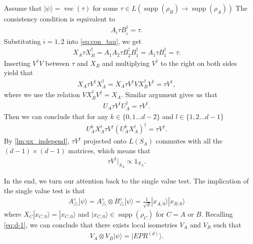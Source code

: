 \documentclass[11pt,letterpaper]{article}
\newcommand{\ket}[1]{|#1\rangle}
\newcommand{\x}{\otimes}
\DeclareMathOperator{\vc}{vec}
\DeclareMathOperator{\supp}{supp}
\newcommand{\1}{\mathbb{1}}
\newcommand{\EPR}[1]{EPR^{(#1)}}
\theoremstyle{definition}
\begin{document}
Assume that $\ket{\psi} = \vc(\tau)$ for some $\tau \in L(\supp(\rho_B) \to \supp(\rho_A))$
The consistency condition is equivalent to
\begin{align}
\label{eq:con_tau}
	A_i \tau B_i^\dagger = \tau.
\end{align}
Substituting $i=1,2$ into \cref{eq:con_tau}, we get 
\begin{align}
	X_A \tau X_B^\dagger = A_1A_2\tau B_2^\dagger B_1^\dagger = A_1\tau B_1^\dagger = \tau.
\end{align}
Inserting $V^\dagger V$ between $\tau$ and $X_B$ and multiplying $V^\dagger$ to the right on both sides yield that 
\begin{align}
	X_A \tau V^\dagger X_A^\dagger = X_A \tau V^\dagger VX_B^\dagger V^\dagger = \tau V^\dagger,
\end{align}
where we use the relation $VX_B^\dagger V^\dagger = X_A$.
Similar argument gives us that 
\begin{align}
	U_A \tau V^\dagger  U_A^\dagger = \tau V^\dagger.
\end{align}
Then we can conclude that for any $k \in \{0,1 \dots d-2\}$ and $l \in \{1,2\dots d-1\}$
\begin{align}
	U_A^kX_A^l \tau V^\dagger (U_A^kX_A^l)^\dagger = \tau V^\dagger.
\end{align}
By \cref{lm:ux_independ}, $\tau V^\dagger$ projected onto $L(S_A)$ commutes with all the $(d-1) \times (d-1)$ matrices, which means that 
\begin{align}
	\label{eq:d-1}
	\tau V^\dagger|_{S_A}  \propto \1_{S_A}.
\end{align}

In the end, we turn our attention back to the single value test. 
The implication of the single value test is that
\begin{align}
	A_\triangle^\diamond \ket{\psi} = A_\triangle^\diamond \x B_\triangle^\diamond \ket{\psi} = \frac{1}{\sqrt{d}}
	\ket{x_{A,0}}\ket{x_{B,0}}
\end{align}
where $X_C \ket{x_{C,0}} = \ket{x_{C,0}}$ and $\ket{x_{C,0}} \in \supp(\rho_C)$ for $C = A$ or $B$. 
Recalling \cref{eq:d-1}, we can conclude that there exists local isometries 
$V_A$ and $V_B$ such that
\begin{align}
	V_A \x V_B \ket{\psi} = \ket{\EPR{d}}.
\end{align}
 
\end{document}
